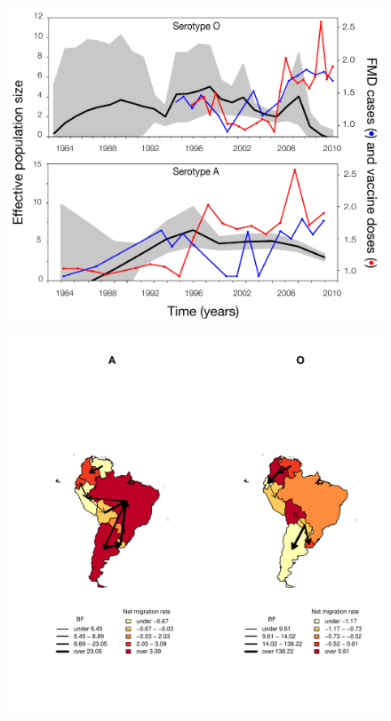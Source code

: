 \documentclass[10pt]{article}
\begin{document}
\newpage
\begin{figure}[!ht]
\begin{center}
\includegraphics[scale=1.0]{FIGURES/skygrid.pdf}
\end{center}
\caption{}
\label{fig:skygrid}
\end{figure}
\newpage
\begin{figure}[!ht]
\begin{center}
\includegraphics[scale=.85]{FIGURES/compound.pdf}
\end{center}
\caption{}
\label{fig:mj&BFs}
\end{figure}
\end{document}
